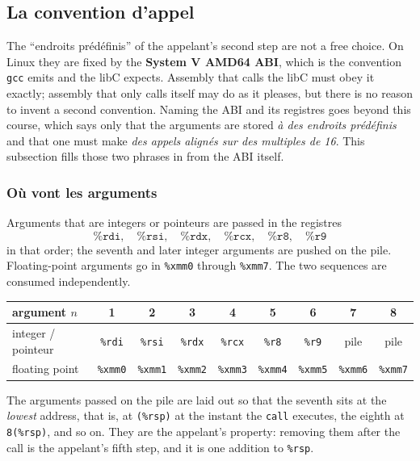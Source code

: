 \subsection{La convention d'appel}
The ``endroits prédéfinis'' of the appelant's second step are not a free choice.
On Linux they are fixed by the \textbf{System V AMD64 ABI}, which is the
convention \texttt{gcc} emits and the libC expects. Assembly that calls the libC
must obey it exactly; assembly that only calls itself may do as it pleases, but
there is no reason to invent a second convention. Naming the ABI and its
registres goes beyond this course, which says only that the arguments are stored
\textit{à des endroits prédéfinis} and that one must make \textit{des appels
alignés sur des multiples de 16}. This subsection fills those two phrases in
from the ABI itself.

\subsubsection{Où vont les arguments}
\begin{definition}
  Arguments that are integers or pointeurs are passed in the registres
  \[
    \texttt{\%rdi},\quad \texttt{\%rsi},\quad \texttt{\%rdx},\quad
    \texttt{\%rcx},\quad \texttt{\%r8},\quad \texttt{\%r9}
  \]
  in that order; the seventh and later integer arguments are pushed on the
  pile. Floating-point arguments go in \texttt{\%xmm0} through
  \texttt{\%xmm7}. The two sequences are consumed independently.
\end{definition}

\begin{center}
  \begin{tabular}{lcccccccc}
    \toprule
    argument $n$ & 1 & 2 & 3 & 4 & 5 & 6 & 7 & 8 \\
    \midrule
    integer / pointeur &
      \texttt{\%rdi} & \texttt{\%rsi} & \texttt{\%rdx} & \texttt{\%rcx} &
      \texttt{\%r8} & \texttt{\%r9} & pile & pile \\
    floating point &
      \texttt{\%xmm0} & \texttt{\%xmm1} & \texttt{\%xmm2} & \texttt{\%xmm3} &
      \texttt{\%xmm4} & \texttt{\%xmm5} & \texttt{\%xmm6} & \texttt{\%xmm7} \\
    \bottomrule
  \end{tabular}
\end{center}

The arguments passed on the pile are laid out so that the seventh sits at the
\emph{lowest} address, that is, at \texttt{(\%rsp)} at the instant the
\texttt{call} executes, the eighth at \texttt{8(\%rsp)}, and so on. They are the
appelant's property: removing them after the call is the appelant's fifth step,
and it is one addition to \texttt{\%rsp}.

